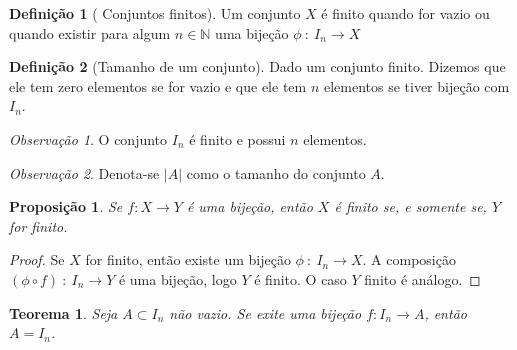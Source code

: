 \documentclass{article}
\theoremstyle{plain}
\newtheorem{prop}{Proposição}[section]
\newtheorem{teo}{Teorema}
\theoremstyle{definition}
\newtheorem{definicao}{Definição}[section]
\theoremstyle{remark}
\newtheorem{obs}{Observação}[section]
\begin{document}
\begin{definicao}[ Conjuntos finitos]
	Um conjunto $X$ é finito quando for vazio ou quando existir para algum $n\in \mathbb{N}$ uma bijeção $\phi \: :\: I_n \to X$
\end{definicao}
\begin{definicao}[Tamanho de um conjunto]
	Dado um conjunto finito. Dizemos que ele tem zero elementos se for vazio e que ele tem $n$ elementos se tiver bijeção com $I_n$.
\end{definicao}
\begin{obs}
	O conjunto $I_n$ é finito e possui $n$ elementos. 
\end{obs}
\begin{obs}
	Denota-se $|A|$ como o tamanho do conjunto $A$.
\end{obs}
\begin{prop}
	Se $f:X\to Y$ é uma bijeção, então $X$ é finito se, e somente se, $Y$ for finito.
\end{prop}
\begin{proof}
	Se $X$ for finito, então existe um bijeção $\phi \: : \: I_n \to X$.  A composição $(\phi \circ f) \: : \: I_n \to Y$ é uma bijeção, logo $Y$ é finito. O caso $Y$ finito é análogo.
\end{proof}
\begin{teo}
	Seja $A\subset I_n$ não vazio. Se exite uma bijeção $f: I_n \to A$, então $A = I_n$.
	\label{TeoremaSubFinito}
\end{teo}
\end{document}
